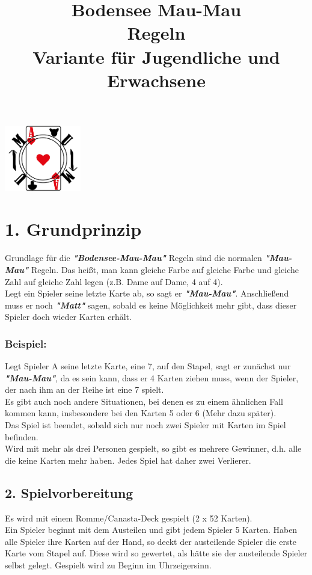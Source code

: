 \documentclass{article}
\title{Bodensee Mau-Mau \\ Regeln \\ Variante für Jugendliche und Erwachsene}
\begin{document}
\maketitle
\begin{center}
\includegraphics[width=0.25\textwidth]{photos/logo.png}
\end{center}

\section*{1. Grundprinzip}
Grundlage für die \textit{\textbf{"Bodensee-Mau-Mau"}} Regeln sind die normalen \textit{\textbf{"Mau-Mau"}} Regeln. Das heißt, man kann gleiche Farbe auf gleiche Farbe und gleiche Zahl auf gleiche Zahl legen (z.B. Dame auf
Dame, 4 auf 4). \\
Legt ein Spieler seine letzte Karte ab, so sagt er \textit{\textbf{"Mau-Mau"}}. Anschließend muss er noch  \textbf{\textit{"Matt"}} sagen, sobald es keine Möglichkeit mehr gibt, dass dieser Spieler doch wieder Karten erhält.
\subsubsection*{Beispiel:}
Legt Spieler A seine letzte Karte, eine 7, auf den Stapel, sagt er zunächst nur \textit{\textbf{"Mau-Mau"}}, da es sein kann, dass er 4 Karten ziehen muss, wenn der Spieler, der nach ihm an der Reihe ist eine 7 spielt. \\
Es gibt auch noch andere Situationen, bei denen es zu einem ähnlichen Fall kommen kann, insbesondere bei den Karten 5 oder 6 (Mehr dazu später). \\
Das Spiel ist beendet, sobald sich nur noch zwei Spieler mit Karten im Spiel befinden. \\ Wird mit mehr als drei Personen gespielt, so gibt es mehrere Gewinner, d.h. alle die keine Karten mehr haben. Jedes Spiel hat daher zwei Verlierer.
\subsection*{2. Spielvorbereitung}
Es wird mit einem Romme/Canasta-Deck gespielt (2 x 52 Karten). \\ Ein Spieler beginnt mit dem Austeilen und gibt jedem Spieler 5 Karten. Haben alle Spieler ihre Karten auf der Hand, so deckt der austeilende Spieler die erste Karte vom Stapel auf. Diese wird so gewertet, als hätte sie der austeilende Spieler selbst gelegt. Gespielt wird zu Beginn im Uhrzeigersinn. \\
\end{document}
